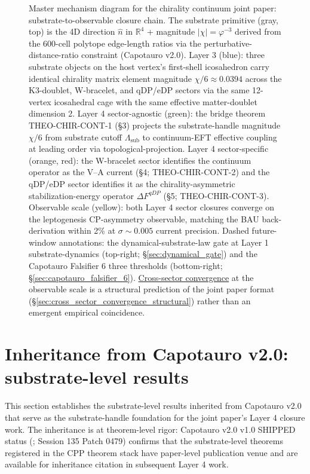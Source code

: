 \documentclass[11pt,letterpaper]{article}
\begin{document}
\begin{figure}[!htbp]
\begin{tikzpicture}
\end{tikzpicture}
\caption{Master mechanism diagram for the chirality continuum joint paper: substrate-to-observable closure chain. The substrate primitive (gray, top) is the 4D direction $\hat{n}$ in $\mathbb{R}^4$ + magnitude $|\chi| = \varphi^{-3}$ derived from the 600-cell polytope edge-length ratios via the perturbative-distance-ratio constraint (Capotauro v2.0). Layer 3 (blue): three substrate objects on the host vertex's first-shell icosahedron carry identical chirality matrix element magnitude $\chi/6 \approx 0.0394$ across the K3-doublet, W-bracelet, and qDP/eDP sectors via the same 12-vertex icosahedral cage with the same effective matter-doublet dimension 2. Layer 4 sector-agnostic (green): the bridge theorem THEO-CHIR-CONT-1 (§3) projects the substrate-handle magnitude $\chi/6$ from substrate cutoff $\Lambda_{\text{sub}}$ to continuum-EFT effective coupling at leading order via topological-projection. Layer 4 sector-specific (orange, red): the W-bracelet sector identifies the continuum operator as the V--A current (§4; THEO-CHIR-CONT-2) and the qDP/eDP sector identifies it as the chirality-asymmetric stabilization-energy operator $\Delta F^{qDP}$ (§5; THEO-CHIR-CONT-3). Observable scale (yellow): both Layer 4 sector closures converge on the leptogenesis CP-asymmetry observable, matching the BAU back-derivation within 2\% at $\sigma \sim 0.005$ current precision. Dashed future-window annotations: the dynamical-substrate-law gate at Layer 1 substrate-dynamics (top-right; §\ref{sec:dynamical_gate}) and the Capotauro Falsifier 6 three thresholds (bottom-right; §\ref{sec:capotauro_falsifier_6}). \hyperref[sec:cross_sector_convergence_structural]{Cross-sector convergence} at the observable scale is a structural prediction of the joint paper format (§\ref{sec:cross_sector_convergence_structural}) rather than an emergent empirical coincidence.}
\label{fig:master_mechanism}
\end{figure}

\section{Inheritance from Capotauro v2.0: substrate-level results}
\label{sec:inheritance}

This section establishes the substrate-level results inherited from Capotauro v2.0 \cite{Capotauro} that serve as the substrate-handle foundation for the joint paper's Layer 4 closure work. The inheritance is at theorem-level rigor: Capotauro v2.0 v1.0 SHIPPED status (\cite{Capotauro}; Session 135 Patch 0479) confirms that the substrate-level theorems registered in the CPP theorem stack \cite{ResearchFrontier} have paper-level publication venue and are available for inheritance citation in subsequent Layer 4 work.
\end{document}
